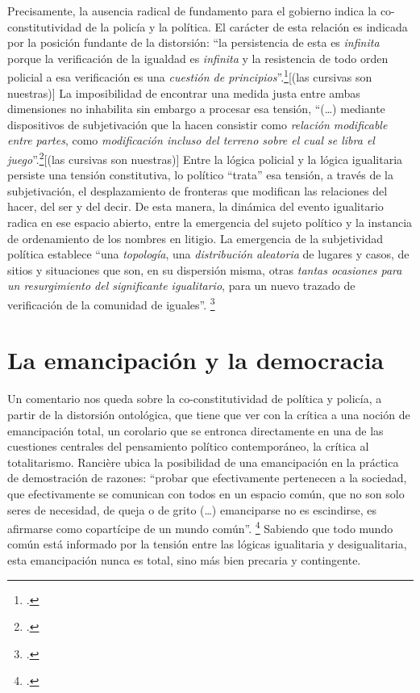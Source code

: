 Precisamente, la ausencia radical de fundamento para el gobierno indica la co-constitutividad de la policía y la política. El carácter de esta relación es indicada por la posición fundante de la distorsión: \enquote{la persistencia de esta es \emph{infinita} porque la verificación de la igualdad es \emph{infinita} y la resistencia de todo orden policial a esa verificación es una \emph{cuestión de principios}}.\footcite[][57]{@7064-RANCIERE2010}[(las cursivas son nuestras)] La imposibilidad de encontrar una medida justa entre ambas dimensiones no inhabilita sin embargo a procesar esa tensión, \enquote{(\ldots)  mediante dispositivos de subjetivación que la hacen consistir como \emph{relación modificable entre partes}, como \emph{modificación incluso del terreno sobre el cual se libra el juego}}.\footcite[][57]{@7064-RANCIERE2010}[(las cursivas son nuestras)] Entre la lógica policial y la lógica igualitaria persiste una tensión constitutiva, lo político \enquote{trata} esa tensión, a través de la subjetivación, el desplazamiento de fronteras que modifican las relaciones del hacer, del ser y del decir. De esta manera, la dinámica del evento igualitario radica en ese espacio abierto, entre la emergencia del sujeto político y la instancia de ordenamiento de los nombres en litigio. La emergencia de la subjetividad política establece \enquote{una \emph{topología}, una \emph{distribución aleatoria} de lugares y casos, de sitios y situaciones que son, en su dispersión misma, otras \emph{tantas ocasiones para un resurgimiento del significante igualitario}, para un nuevo trazado de verificación de la comunidad de iguales}. \footcite[][71]{@7065-RANCIERE2007}

\section{La emancipación y la democracia}


Un comentario nos queda sobre la co-constitutividad de política y policía, a partir de la distorsión ontológica, que tiene que ver con la crítica a una noción de emancipación total, un corolario que se entronca directamente en una de las cuestiones centrales del pensamiento político contemporáneo, la crítica al totalitarismo. Rancière ubica la posibilidad de una emancipación en la práctica de demostración de razones: \enquote{probar que efectivamente pertenecen a la sociedad, que efectivamente se comunican con todos en un espacio común, que no son solo seres de necesidad, de queja o de grito (\ldots)  emanciparse no es escindirse, es afirmarse como copartícipe de un mundo común}. \footcite[][39]{@7086-RANCIERE2007} Sabiendo que todo mundo común está informado por la tensión entre las lógicas igualitaria y desigualitaria, esta emancipación nunca es total, sino más bien precaria y contingente.

